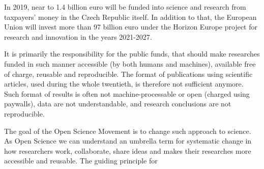 In 2019, near to 1.4 billion euro will be funded into science and research from taxpayers' money in the Czech Republic itself\cite{rvvi-budget}.
In addition to that, the European Union will invest more than 97 billion euro under the Horizon Europe project for research and innovation in the years 2021-2027\cite{euc-horizon-budget}.

It is primarily the responsibility for the public funds, that should make researches funded in such manner accessible (by both humans and machines), available free of charge, reusable and reproducible.
The format of publications using scientific articles, used during the whole twentieth, is therefore not sufficient anymore.
Such format of results is often not machine-processable or open (charged using paywalls), data are not understandable, and research conclusions are not reproducible.

The goal of the Open Science Movement is to change such approach to science.
As Open Science we can understand an umbrella term for systematic change in how researchers work, collaborate, share ideas and makes their researches more accessible and reusable.
The guiding principle for 
